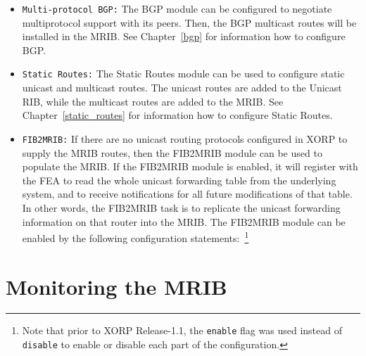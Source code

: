 \begin{itemize}

  \item {\tt Multi-protocol BGP:} The BGP module can be configured to
  negotiate multiprotocol support with its peers. Then, the BGP
  multicast routes will be installed in the MRIB. See
  Chapter~\ref{bgp} for information how to configure BGP.

  \item {\tt Static Routes:} The Static Routes module can be used to
  configure static unicast and multicast routes. The unicast routes are
  added to the Unicast RIB, while the multicast routes are added to the
  MRIB. See Chapter~\ref{static_routes} for information how to configure
  Static Routes.

  \item {\tt FIB2MRIB:} If there are no unicast routing protocols
  configured in XORP to supply the MRIB routes, then the FIB2MRIB module
  can be used to populate the MRIB. If the FIB2MRIB module is enabled,
  it will register with the FEA to read the whole unicast forwarding
  table from the underlying system, and to receive notifications for all
  future modifications of that table. In other words, the FIB2MRIB task
  is to replicate the unicast forwarding information on that router into
  the MRIB. The FIB2MRIB module can be enabled by the following
  configuration statements:~\footnote{Note that prior to XORP
  Release-1.1, the {\tt enable} flag was used instead of {\tt disable}
  to enable or disable each part of the configuration.}

\vspace{0.1in}
\noindent{}
\vspace{0.1in}

\end{itemize}


\section{Monitoring the MRIB}


